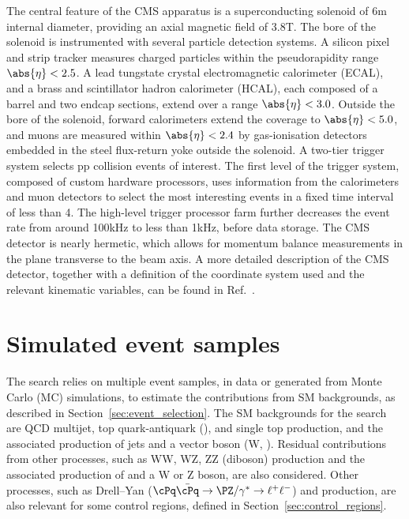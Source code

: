 The central feature of the CMS apparatus is a superconducting solenoid
of 6\unit{m} internal diameter, providing an axial magnetic field of
3.8\unit{T}. The bore of the solenoid is instrumented with several
particle detection systems. A silicon pixel and strip tracker measures
charged particles within the pseudorapidity range $\abs{\eta} < 2.5$.
A lead tungstate crystal electromagnetic calorimeter (ECAL), and a
brass and scintillator hadron calorimeter (HCAL), each composed of a
barrel and two endcap sections, extend over a range $\abs{\eta} <
3.0$.
Outside the bore of the solenoid, forward calorimeters extend the
coverage to $\abs{\eta} < 5.0$, and muons are measured within
$\abs{\eta} < 2.4$ by gas-ionisation detectors embedded in the steel
flux-return yoke outside the solenoid. A two-tier trigger system
selects pp collision events of interest. The first level of the
trigger system, composed of custom hardware processors, uses
information from the calorimeters and muon detectors to select the
most interesting events in a fixed time interval of less than
4\mus. The high-level trigger processor farm further decreases the
event rate from around 100\unit{kHz} to less than 1\unit{kHz}, before
data storage. The CMS detector is nearly hermetic, which allows for
momentum balance measurements in the plane transverse to the beam
axis. A more detailed description of the CMS detector, together with a
definition of the coordinate system used and the relevant kinematic
variables, can be found in Ref.~\cite{Chatrchyan:2008zzk}.

\section{Simulated event samples}
\label{sec:simulation}

The search relies on multiple event samples, in data or generated from
Monte Carlo (MC) simulations, to estimate the contributions from SM
backgrounds, as described in Section~\ref{sec:event_selection}.
The SM backgrounds for the search are QCD multijet, top
quark-antiquark (\ttbar), and single top production, and the
associated production of jets and a vector boson (W,
\znunu). Residual contributions from other processes, such as WW, WZ,
ZZ (diboson) production and the associated production of \ttbar and a
W or Z boson, are also considered. Other processes, such as Drell--Yan
($\cPq\bar{\cPq} \to  \PZ/\gamma^*  \to
\ell^+\ell^-$) and \gj production, are also relevant for some control
regions, defined in Section~\ref{sec:control_regions}.

